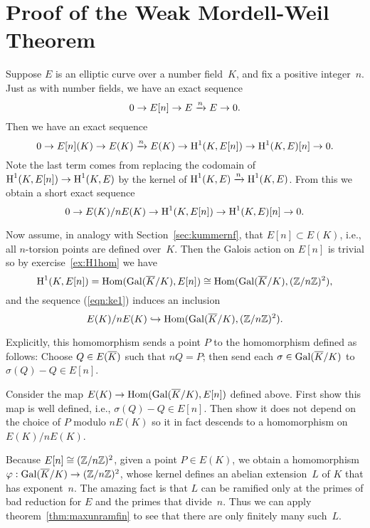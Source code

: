 \section{Proof of the Weak Mordell-Weil Theorem}
Suppose $E$ is an elliptic curve over a number field~$K$, and
fix a positive integer~$n$.
Just as with number fields, we have an exact sequence
$$
	0 \to E[n] \to E \xrightarrow{n} E \to 0.
$$
Then we have an exact sequence
$$
	0 \to E[n](K) \to E(K) \xrightarrow{n} E(K) \to \operatorname{H}^1(K,E[n]) \to \operatorname{H}^1(K,E)[n] \to 0.
$$
Note the last term comes from replacing the codomain of
$\operatorname{H}^1(K,E[n]) \to \operatorname{H}^1(K,E)$ by the kernel of $\operatorname{H}^1(K,E) \xrightarrow{n} \operatorname{H}^1(K,E)$.
From this we obtain a short exact sequence
\begin{equation}\label{eqn:ke1}
	0 \to E(K)/n E(K) \to \operatorname{H}^1(K,E[n]) \to \operatorname{H}^1(K,E)[n] \to 0.
\end{equation}

Now assume, in analogy with Section~\ref{sec:kummernf}, that
$E[n]\subset E(K)$, i.e., all $n$-torsion points are defined over~$K$.
Then the Galois action on $E[n]$ is trivial so by
exercise~\ref{ex:H1hom} we have
$$
	\H^1(K,E[n]) = \Hom(\Gal(\Kbar/K),E[n]) \cong %
	\Hom(\Gal(\Kbar/K),(\Z/n\Z)^2),
$$
and the sequence (\ref{eqn:ke1}) induces an inclusion
\begin{equation}\label{eqn:injmw}
	E(K)/n E(K) \hookrightarrow \operatorname{Hom}(\operatorname{Gal}(\overline{K}/K),(\mathbb{Z}/n\mathbb{Z})^2).
\end{equation}

Explicitly, this homomorphism sends a point $P$ to the homomorphism
defined as follows: Choose $Q \in E(\overline{K})$ such that $nQ = P$; then
send each $\sigma \in \operatorname{Gal}(\overline{K}/K)$ to $\sigma(Q)-Q\in E[n]$.

\begin{exercise}
	Consider the map $E(K) \to \operatorname{Hom}(\operatorname{Gal}(\overline{K}/K),E[n])$ defined above.
	First show this map is well defined, i.e., $\sigma(Q) - Q \in E[n]$.
	Then show it does not depend on the choice of $P$ modulo $nE(K)$
	so it in fact descends to a homomorphism on $E(K)/nE(K)$.
\end{exercise}

Because $E[n] \cong (\mathbb{Z}/n\mathbb{Z})^2$, %
given a point $P\in E(K)$, we obtain a homomorphism
$\varphi : \operatorname{Gal}(\overline{K}/K) \to (\mathbb{Z}/n\mathbb{Z})^2$, whose kernel defines an
abelian extension~$L$ of $K$ that has exponent~$n$.
The amazing fact is that $L$ can be ramified only at the primes
of bad reduction for $E$ and the primes that divide~$n$.
Thus we can apply theorem~\ref{thm:maxunramfin} to see that there are
only finitely many such~$L$.

